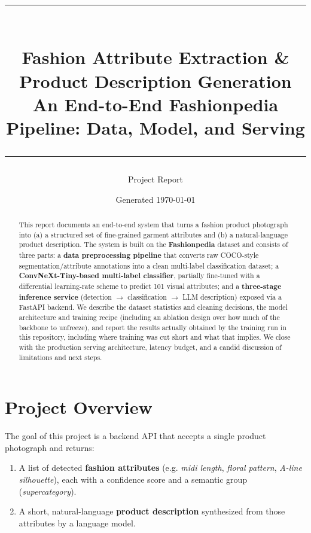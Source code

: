 \documentclass[11pt]{article}
\title{
  \vspace{-1.5cm}
  {\color{cobalt}\rule{\linewidth}{1.2pt}}\\[0.4cm]
  {\Huge\bfseries Fashion Attribute Extraction \& \\ Product Description Generation}\\[0.3cm]
  {\Large\color{gray} An End-to-End Fashionpedia Pipeline: Data, Model, and Serving}\\[0.3cm]
  {\color{cobalt}\rule{\linewidth}{1.2pt}}
}
\author{Project Report}
\date{Generated \today}
\begin{document}
\maketitle
\thispagestyle{empty}

\begin{abstract}
\noindent
This report documents an end-to-end system that turns a fashion product photograph into (a) a structured set of fine-grained garment attributes and (b) a natural-language product description. The system is built on the \textbf{Fashionpedia} dataset and consists of three parts: a \textbf{data preprocessing pipeline} that converts raw COCO-style segmentation/attribute annotations into a clean multi-label classification dataset; a \textbf{ConvNeXt-Tiny-based multi-label classifier}, partially fine-tuned with a differential learning-rate scheme to predict 101 visual attributes; and a \textbf{three-stage inference service} (detection $\to$ classification $\to$ LLM description) exposed via a FastAPI backend. We describe the dataset statistics and cleaning decisions, the model architecture and training recipe (including an ablation design over how much of the backbone to unfreeze), and report the results actually obtained by the training run in this repository, including where training was cut short and what that implies. We close with the production serving architecture, latency budget, and a candid discussion of limitations and next steps.
\end{abstract}

\vspace{0.3cm}
\tableofcontents
\newpage

\section{Project Overview}

The goal of this project is a backend API that accepts a single product photograph and returns:

\begin{enumerate}
\item A list of detected \textbf{fashion attributes} (e.g. \emph{midi length}, \emph{floral pattern}, \emph{A-line silhouette}), each with a confidence score and a semantic group (\emph{supercategory}).
\item A short, natural-language \textbf{product description} synthesized from those attributes by a language model.
\end{enumerate}
\end{document}
